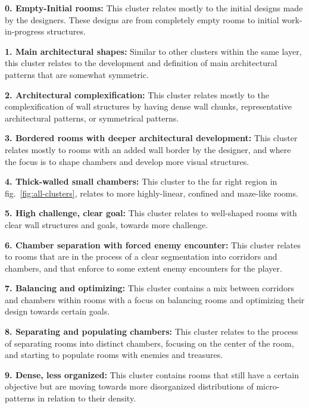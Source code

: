 \textbf{0. Empty-Initial rooms:} %
This cluster relates mostly to the initial designs made by the designers. These designs are from completely empty rooms to initial work-in-progress structures.

\textbf{1. Main architectural shapes:} Similar to other clusters within the same layer, this cluster relates to the development and definition of main architectural patterns that are somewhat symmetric.

\textbf{2. Architectural complexification:} %
This cluster relates mostly to the complexification of wall structures by having dense wall chunks, representative architectural patterns, or symmetrical patterns.

\textbf{3. Bordered rooms with deeper architectural development:} This cluster relates mostly to rooms with an added wall border by the designer, and where the focus is to shape chambers and develop more visual structures.

\textbf{4. Thick-walled small chambers:} This cluster to the far right region in fig.~\ref{fig:all-clusters}, relates to more highly-linear, confined and maze-like rooms.%

\textbf{5. High challenge, clear goal:} This cluster relates to well-shaped rooms with clear wall structures and goals, towards more challenge. 

\textbf{6. Chamber separation with forced enemy encounter:} This cluster relates to rooms that are in the process of a clear segmentation into corridors and chambers, and that enforce to some extent enemy encounters for the player. 

\textbf{7. Balancing and optimizing:} This cluster contains a mix between corridors and chambers within rooms with a focus on balancing rooms and optimizing their design towards certain goals. %

\textbf{8. Separating and populating chambers:} This cluster relates to the process of separating rooms into distinct chambers, focusing on the center of the room, and starting to populate rooms with enemies and treasures. %

\textbf{9. Dense, less organized:} This cluster contains rooms that still have a certain objective but are moving towards more disorganized distributions of micro-patterns in relation to their density. %

